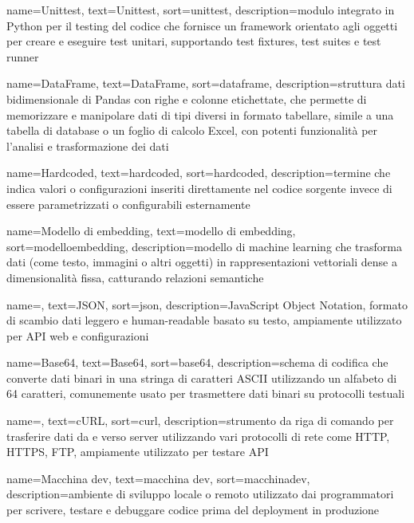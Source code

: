  {
    name=Unittest,
    text=Unittest,
    sort=unittest,
    description={modulo integrato in Python per il testing del codice che fornisce un framework orientato agli oggetti per creare e eseguire test unitari, supportando test fixtures, test suites e test runner}
}

 {
    name=DataFrame,
    text=DataFrame,
    sort=dataframe,
    description={struttura dati bidimensionale di Pandas con righe e colonne etichettate, che permette di memorizzare e manipolare dati di tipi diversi in formato tabellare, simile a una tabella di database o un foglio di calcolo Excel, con potenti funzionalità per l'analisi e trasformazione dei dati}
}

 {
    name=Hardcoded,
    text=hardcoded,
    sort=hardcoded,
    description={termine che indica valori o configurazioni inseriti direttamente nel codice sorgente invece di essere parametrizzati o configurabili esternamente}
}

 {
    name=Modello di embedding,
    text=modello di embedding,
    sort=modelloembedding,
    description={modello di machine learning che trasforma dati (come testo, immagini o altri oggetti) in rappresentazioni vettoriali dense a dimensionalità fissa, catturando relazioni semantiche}
}

 {
    name=,
    text=JSON,
    sort=json,
    description={JavaScript Object Notation, formato di scambio dati leggero e human-readable basato su testo, ampiamente utilizzato per API web e configurazioni}
}

 {
    name=Base64,
    text=Base64,
    sort=base64,
    description={schema di codifica che converte dati binari in una stringa di caratteri ASCII utilizzando un alfabeto di 64 caratteri, comunemente usato per trasmettere dati binari su protocolli testuali}
}

 {
    name=,
    text=cURL,
    sort=curl,
    description={strumento da riga di comando per trasferire dati da e verso server utilizzando vari protocolli di rete come HTTP, HTTPS, FTP, ampiamente utilizzato per testare API}
}

 {
    name=Macchina dev,
    text=macchina dev,
    sort=macchinadev,
    description={ambiente di sviluppo locale o remoto utilizzato dai programmatori per scrivere, testare e debuggare codice prima del deployment in produzione}
}

